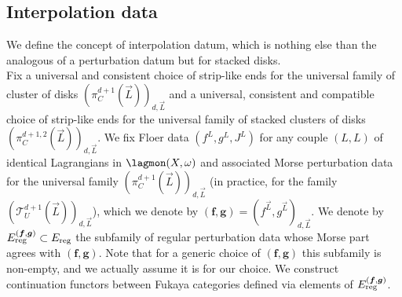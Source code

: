 	
	\subsection{Interpolation data}\label{intdata}
	
	We define the concept of interpolation datum, which is nothing else than the analogous of a perturbation datum but for stacked disks.\\
	Fix a universal and consistent choice of strip-like ends for the universal family of cluster of disks $(\pi^{d+1}_C(\vec{L}))_{d,\vec{L}}$ and a universal, consistent and compatible choice of strip-like ends for the universal family of stacked clusters of disks $(\pi^{d+1,2}_C(\vec{L}))_{d,\vec{L}}$. We fix Floer data $(f^L,g^L,J^L)$ for any couple $(L,L)$ of identical Lagrangians in $\lagmon(X,\omega)$ and associated Morse perturbation data for the universal family $(\pi^{d+1}_C(\vec{L}))_{d,\vec{L}}$ (in practice, for the family $(\mathcal{T}^{d+1}_U(\vec{L}))_{d,\vec{L}}$), which we denote by $(\boldsymbol{f}, \boldsymbol{g})=(f^{\vec{L}}, g^{\vec{L}})_{d,\vec{L}}$. We denote by $E^{(\boldsymbol{f},\boldsymbol{g})}_\textnormal{reg}\subset E_\textnormal{reg}$ the subfamily of regular perturbation data whose Morse part agrees with $(\boldsymbol{f},\boldsymbol{g})$. Note that for a generic choice of $(\boldsymbol{f}, \boldsymbol{g})$ this subfamily is non-empty, and we actually assume it is for our choice. We construct continuation functors between Fukaya categories defined via elements of $E^{(\boldsymbol{f},\boldsymbol{g})}_\textnormal{reg}$.\\

